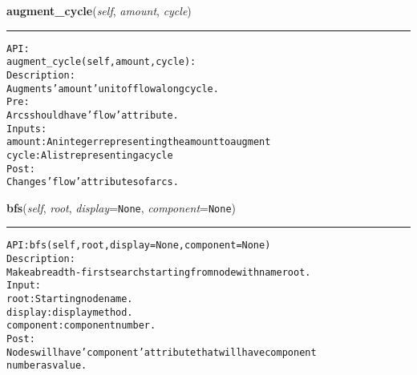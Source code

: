     \label{coinor:gimpy:graph:Graph:augment_cycle}

    \vspace{0.5ex}

\hspace{.8\funcindent}\begin{boxedminipage}{\funcwidth}

    \raggedright \textbf{augment\_cycle}(\textit{self}, \textit{amount}, \textit{cycle})

    \vspace{-1.5ex}

    \rule{\textwidth}{0.5\fboxrule}
\setlength{\parskip}{2ex}
\begin{alltt}

API:
    augment\_cycle(self, amount, cycle):
Description:
    Augments 'amount' unit of flow along cycle.
Pre:
    Arcs should have 'flow' attribute.
Inputs:
    amount: An integer representing the amount to augment
    cycle: A list representing a cycle
Post:
    Changes 'flow' attributes of arcs.
\end{alltt}

\setlength{\parskip}{1ex}
    \end{boxedminipage}

    \label{coinor:gimpy:graph:Graph:bfs}

    \vspace{0.5ex}

\hspace{.8\funcindent}\begin{boxedminipage}{\funcwidth}

    \raggedright \textbf{bfs}(\textit{self}, \textit{root}, \textit{display}={\tt None}, \textit{component}={\tt None})

    \vspace{-1.5ex}

    \rule{\textwidth}{0.5\fboxrule}
\setlength{\parskip}{2ex}
\begin{alltt}

API: bfs(self, root, display = None, component=None)
Description:
Make a breadth-first search starting from node with name root.
Input:
    root: Starting node name.
    display: display method.
    component: component number.
Post:
    Nodes will have 'component' attribute that will have component
    number as value.
\end{alltt}

\setlength{\parskip}{1ex}
    \end{boxedminipage}

